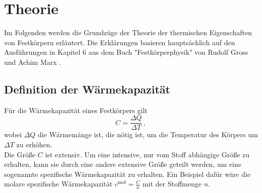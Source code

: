 \section{Theorie}
\label{sec:Theorie}
Im Folgenden werden die Grundzüge der Theorie der thermischen Eigenschaften von Festkörpern erläutert. Die Erklärungen basieren hauptsächlich auf den Ausführungen in Kapitel 6 aus dem Buch "Festkörperphysik" von Rudolf Gross und Achim Marx \cite{grossMarx}.

\subsection{Definition der Wärmekapazität}
\label{sec:definitionWaermekapazität}
Für die Wärmekapazität eines Festkörpers gilt
\begin{equation}
  C = \frac{\Delta Q}{\Delta T}\,,
  \label{eqn:C}
\end{equation}
wobei $\Delta Q$ die Wärmemänge ist, die nötig ist, um die Temperatur des Körpers um $\Delta T$ zu erhöhen.\\
Die Größe $C$ ist extensiv. Um eine intensive, nur vom Stoff abhängige Größe zu erhalten, kann sie durch eine andere extensive Größe geteilt werden, um eine sogenannte spezifische Wärmekapazität zu erhalten. Ein Beispiel dafür wäre die molare spezifische Wärmekapazität $c^{\text{mol}} = \frac{C}{n}$ mit der Stoffmenge $n$.

